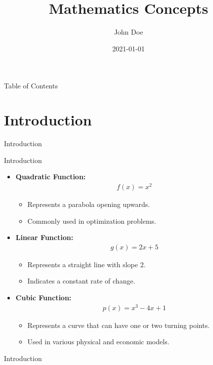 \documentclass{beamer}
\title{Mathematics Concepts}
\subtitle{}
\author{John Doe}
\institute{}
\date{2021-01-01}
\begin{document}
\begin{frame}
\titlepage
\end{frame}
\begin{frame}{Table of Contents}
\tableofcontents
\end{frame}
\section{Introduction}
\begin{frame}
\centering
\Huge{Introduction}
\end{frame}
\begin{frame}{Introduction}
\begin{itemize}
    \item \textbf{Quadratic Function:} 
    \begin{align*}
    f(x) = x^2
    \end{align*}
    \begin{itemize}
        \item Represents a parabola opening upwards.
        \item Commonly used in optimization problems.
    \end{itemize}
    
    \item \textbf{Linear Function:}
    \begin{align*}
    g(x) = 2x + 5
    \end{align*}
    \begin{itemize}
        \item Represents a straight line with slope 2.
        \item Indicates a constant rate of change.
    \end{itemize}

    \item \textbf{Cubic Function:}
    \begin{align*}
    p(x) = x^3 - 4x + 1
    \end{align*}
    \begin{itemize}
        \item Represents a curve that can have one or two turning points.
        \item Used in various physical and economic models.
    \end{itemize}
\end{itemize}\end{frame}
\begin{frame}{Introduction}
\end{frame}
\end{document}

